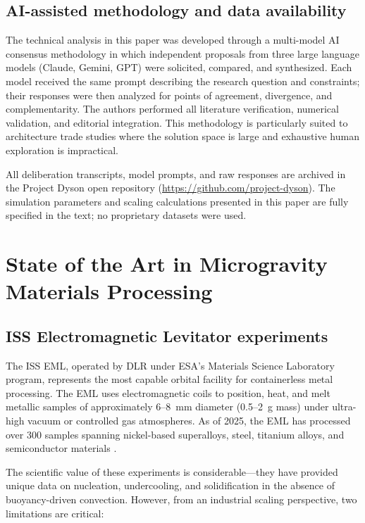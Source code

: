 \documentclass[preprint,12pt]{elsarticle}
\begin{document}
\subsection{AI-assisted methodology and data availability}
\label{sec:methodology}

The technical analysis in this paper was developed through a multi-model AI consensus methodology \cite{hakkenberg2026consensus} in which independent proposals from three large language models (Claude, Gemini, GPT) were solicited, compared, and synthesized. Each model received the same prompt describing the research question and constraints; their responses were then analyzed for points of agreement, divergence, and complementarity. The authors performed all literature verification, numerical validation, and editorial integration. This methodology is particularly suited to architecture trade studies where the solution space is large and exhaustive human exploration is impractical.

All deliberation transcripts, model prompts, and raw responses are archived in the Project Dyson open repository (\url{https://github.com/project-dyson}). The simulation parameters and scaling calculations presented in this paper are fully specified in the text; no proprietary datasets were used.

\section{State of the Art in Microgravity Materials Processing}
\label{sec:state-of-art}

\subsection{ISS Electromagnetic Levitator experiments}

The ISS EML, operated by DLR under ESA's Materials Science Laboratory program, represents the most capable orbital facility for containerless metal processing. The EML uses electromagnetic coils to position, heat, and melt metallic samples of approximately 6--8~mm diameter (0.5--2~g mass) under ultra-high vacuum or controlled gas atmospheres. As of 2025, the EML has processed over 300 samples spanning nickel-based superalloys, steel, titanium alloys, and semiconductor materials \cite{ratke1995,nasa2020eml,luo2023}.

The scientific value of these experiments is considerable---they have provided unique data on nucleation, undercooling, and solidification in the absence of buoyancy-driven convection. However, from an industrial scaling perspective, two limitations are critical:
\end{document}
